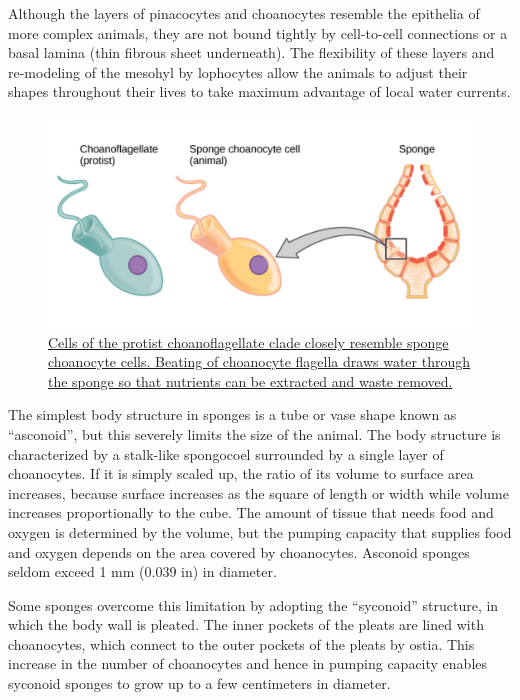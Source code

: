 Although the layers of pinacocytes and choanocytes resemble the epithelia of more complex animals, they are not bound tightly by cell-to-cell connections or a basal lamina (thin fibrous sheet underneath). The flexibility of these layers and re-modeling of the mesohyl by lophocytes allow the animals to adjust their shapes throughout their lives to take maximum advantage of local water currents.



\begin{figure}

{\centering \includegraphics[width=0.7\linewidth]{./figures/animals/Choanoflagellate_and_choanocyte} 

}

\caption{\href{https://commons.wikimedia.org/wiki/File:Choanoflagellate_and_choanocyte.png}{Cells of the protist choanoflagellate clade closely resemble sponge choanocyte cells. Beating of choanocyte flagella draws water through the sponge so that nutrients can be extracted and waste removed.}}\label{fig:choanocomp}
\end{figure}

The simplest body structure in sponges is a tube or vase shape known as ``asconoid'', but this severely limits the size of the animal. The body structure is characterized by a stalk-like spongocoel surrounded by a single layer of choanocytes. If it is simply scaled up, the ratio of its volume to surface area increases, because surface increases as the square of length or width while volume increases proportionally to the cube. The amount of tissue that needs food and oxygen is determined by the volume, but the pumping capacity that supplies food and oxygen depends on the area covered by choanocytes. Asconoid sponges seldom exceed 1 mm (0.039 in) in diameter.

Some sponges overcome this limitation by adopting the ``syconoid'' structure, in which the body wall is pleated. The inner pockets of the pleats are lined with choanocytes, which connect to the outer pockets of the pleats by ostia. This increase in the number of choanocytes and hence in pumping capacity enables syconoid sponges to grow up to a few centimeters in diameter.

